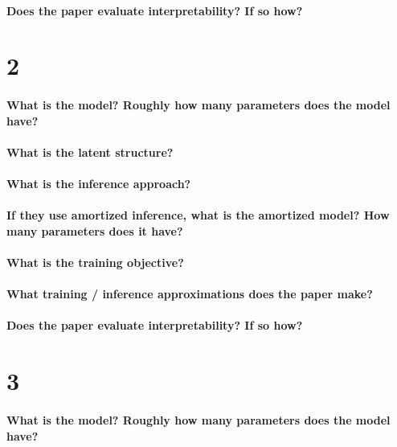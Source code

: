 \documentclass[11pt]{article}
\begin{document}
\paragraph{Does the paper evaluate interpretability? If so how?}

\section{2}

\paragraph{What is the model? Roughly how many parameters does the model have?}

\paragraph{What is the latent structure?}

\paragraph{What is the inference approach?}

\paragraph{If they use amortized inference, what is the amortized model? How many parameters does it have?}

\paragraph{What is the training objective?}

\paragraph{What training / inference approximations does the paper make?}

\paragraph{Does the paper evaluate interpretability? If so how?}

\section{3}

\paragraph{What is the model? Roughly how many parameters does the model have?}
\end{document}
